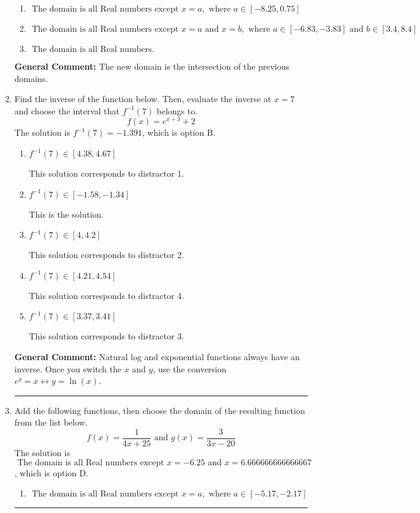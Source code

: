 \documentclass{extbook}[14pt]
\newcommand{\litem}[1]{\item #1

\rule{\textwidth}{0.4pt}}
\begin{document}
\begin{enumerate}
{\begin{enumerate}[label=\Alph*.]
\item \( \text{ The domain is all Real numbers except } x = a, \text{ where } a \in [-8.25, 0.75] \)


\item \( \text{ The domain is all Real numbers except } x = a \text{ and } x = b, \text{ where } a \in [-6.83, -3.83] \text{ and } b \in [3.4, 8.4] \)


\item \( \text{ The domain is all Real numbers. } \)


\end{enumerate}

\textbf{General Comment:} The new domain is the intersection of the previous domains.
}
\litem{
Find the inverse of the function below. Then, evaluate the inverse at $x = 7$ and choose the interval that $f^{-1}(7)$ belongs to.
\[ f(x) = e^{x+3}+2 \]The solution is \( f^{-1}(7) = -1.391 \), which is option B.\begin{enumerate}[label=\Alph*.]
\item \( f^{-1}(7) \in [4.38, 4.67] \)

 This solution corresponds to distractor 1.
\item \( f^{-1}(7) \in [-1.58, -1.34] \)

 This is the solution.
\item \( f^{-1}(7) \in [4, 4.2] \)

 This solution corresponds to distractor 2.
\item \( f^{-1}(7) \in [4.21, 4.54] \)

 This solution corresponds to distractor 4.
\item \( f^{-1}(7) \in [3.37, 3.41] \)

 This solution corresponds to distractor 3.
\end{enumerate}

\textbf{General Comment:} Natural log and exponential functions always have an inverse. Once you switch the $x$ and $y$, use the conversion $ e^y = x \leftrightarrow y=\ln(x)$.
}
\litem{
Add the following functions, then choose the domain of the resulting function from the list below.
\[ f(x) = \frac{1}{4x+25} \text{ and } g(x) = \frac{3}{3x-20} \]The solution is \( \text{ The domain is all Real numbers except } x = -6.25 \text{ and } x = 6.666666666666667 \), which is option D.\begin{enumerate}[label=\Alph*.]
\item \( \text{ The domain is all Real numbers except } x = a, \text{ where } a \in [-5.17, -2.17] \)



\end{enumerate}}
\end{enumerate}
\end{document}
